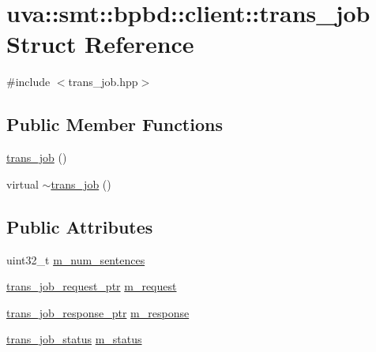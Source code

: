 \hypertarget{structuva_1_1smt_1_1bpbd_1_1client_1_1trans__job}{}\section{uva\+:\+:smt\+:\+:bpbd\+:\+:client\+:\+:trans\+\_\+job Struct Reference}
\label{structuva_1_1smt_1_1bpbd_1_1client_1_1trans__job}


{\ttfamily \#include $<$trans\+\_\+job.\+hpp$>$}

\subsection*{Public Member Functions}
\begin{DoxyCompactItemize}
\item 
\hyperlink{structuva_1_1smt_1_1bpbd_1_1client_1_1trans__job_a88712892ffaf03db8499e413d0b33e41}{trans\+\_\+job} ()
\item 
virtual \hyperlink{structuva_1_1smt_1_1bpbd_1_1client_1_1trans__job_a96069250ad631223837837dd0e9694a3}{$\sim$trans\+\_\+job} ()
\end{DoxyCompactItemize}
\subsection*{Public Attributes}
\begin{DoxyCompactItemize}
\item 
uint32\+\_\+t \hyperlink{structuva_1_1smt_1_1bpbd_1_1client_1_1trans__job_a820ad0c2ec3ff0aaf83d7c80a67c2be2}{m\+\_\+num\+\_\+sentences}
\item 
\hyperlink{namespaceuva_1_1smt_1_1bpbd_1_1common_1_1messaging_af373ab262c0cab837c6ebe5e2eb62ea2}{trans\+\_\+job\+\_\+request\+\_\+ptr} \hyperlink{structuva_1_1smt_1_1bpbd_1_1client_1_1trans__job_a94c265e9fb90fcae9eb5eb10778b190a}{m\+\_\+request}
\item 
\hyperlink{namespaceuva_1_1smt_1_1bpbd_1_1common_1_1messaging_a13f39e68e38d11dbd940edb12359e1a3}{trans\+\_\+job\+\_\+response\+\_\+ptr} \hyperlink{structuva_1_1smt_1_1bpbd_1_1client_1_1trans__job_a684731a5672adf930cc93e9759a30974}{m\+\_\+response}
\item 
\hyperlink{classuva_1_1smt_1_1bpbd_1_1client_1_1trans__job__status}{trans\+\_\+job\+\_\+status} \hyperlink{structuva_1_1smt_1_1bpbd_1_1client_1_1trans__job_a11a9bf2812991f8e4e36b3884dc149f7}{m\+\_\+status}
\end{DoxyCompactItemize}


